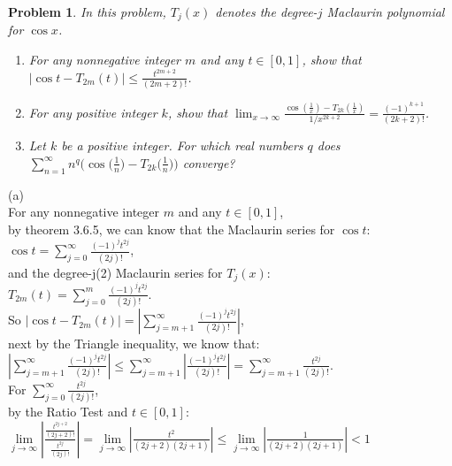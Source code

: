 \documentclass[12pt,reqno]{amsart}
\newtheorem{problem}{Problem}
\begin{document}
\medskip
\begin{problem}
In this problem, $T_j(x)$ denotes the degree-$j$ Maclaurin polynomial for $\cos x$.
\begin{enumerate}
\item For any nonnegative integer $m$ and any $t\in[0,1]$, show that $\displaystyle \bigl| \cos t - T_{2m}(t) \bigr| \le \frac{t^{2m+2}}{(2m+2)!}$.
\item For any positive integer $k$, show that $\displaystyle\lim_{x\to\infty} \frac{\cos(\frac1x) - T_{2k}(\frac1x)}{1/x^{2k+2}} = \frac{(-1)^{k+1}}{(2k+2)!}$.
\item Let $k$ be a positive integer. For which real numbers $q$ does $\displaystyle\sum_{n=1}^\infty n^q \biggl( \cos \biggl( \frac1n \biggr) - T_{2k} \biggl( \frac1n \biggr) \biggr)$ converge?
\end{enumerate}
\end{problem}
(a)\\For any nonnegative integer $m$ and any $t\in[0,1]$, 
\\by theorem 3.6.5, we can know that the Maclaurin series for $\cos t$:
\\$\cos t=\sum_{j=0}^{\infty} \frac{(-1)^j t^{2 j}}{(2 j) !}$,
\\and the degree-j(2) Maclaurin series for $T_j(x)$:
\\ $T_{2m}(t)=\sum_{j=0}^{m} \frac{(-1)^j t^{2 j}}{(2 j) !}$.
\\So $\displaystyle \bigl| \cos t - T_{2m}(t) \bigr|=|\sum_{j=m+1}^{\infty} \frac{(-1)^j t^{2 j}}{(2 j) !}|$,
\\next by the Triangle inequality, we know that:
\\$|\sum_{j=m+1}^{\infty} \frac{(-1)^j t^{2 j}}{(2 j) !}|\leq\sum_{j=m+1}^{\infty}| \frac{(-1)^j t^{2 j}}{(2 j) !}|=\sum_{j=m+1}^{\infty}\frac{ t^{2 j}}{(2 j) !}$.
\\For $\sum_{j=0}^{\infty}\frac{ t^{2 j}}{(2 j) !}$,
\\by the Ratio Test and  $t\in[0,1]$: $\lim\limits_{j\to\infty}|\frac{\frac{ t^{2 j+2}}{(2 j+2) !}}{\frac{ t^{2 j}}{(2 j) !}}|=\lim\limits_{j\to\infty}|\frac{t^2}{(2j+2)(2j+1)}|\leq\lim\limits_{j\to\infty}|\frac{1}{(2j+2)(2j+1)}|<1$
\end{document}

